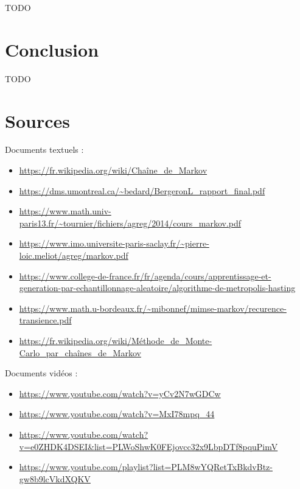 \documentclass{article}
\begin{document}
TODO \\

\newpage
\section{Conclusion}

TODO \\

\newpage
\section{Sources}

Documents textuels :
\begin{itemize}
\item \url{https://fr.wikipedia.org/wiki/Chaîne_de_Markov}
\item \url{https://dms.umontreal.ca/~bedard/BergeronL_rapport_final.pdf}
\item \url{https://www.math.univ-paris13.fr/~tournier/fichiers/agreg/2014/cours_markov.pdf}
\item \url{https://www.imo.universite-paris-saclay.fr/~pierre-loic.meliot/agreg/markov.pdf}
\item \url{https://www.college-de-france.fr/fr/agenda/cours/apprentissage-et-generation-par-echantillonnage-aleatoire/algorithme-de-metropolis-hasting}
\item \url{https://www.math.u-bordeaux.fr/~mibonnef/mimse-markov/recurence-transience.pdf} \\
\item \url{https://fr.wikipedia.org/wiki/Méthode_de_Monte-Carlo_par_chaînes_de_Markov} \\
\end{itemize}

Documents vidéos :
\begin{itemize}
\item \url{https://www.youtube.com/watch?v=yCv2N7wGDCw}
\item \url{https://www.youtube.com/watch?v=MxI78mpq_44}
\item \url{https://www.youtube.com/watch?v=e0ZHDK4DSEI&list=PLWoShwK0FEjovcc32x9LbpDTf8pquPimV}
\item \url{https://www.youtube.com/playlist?list=PLM8wYQRetTxBkdvBtz-gw8b9lcVkdXQKV} \\
\end{itemize}
\end{document}
